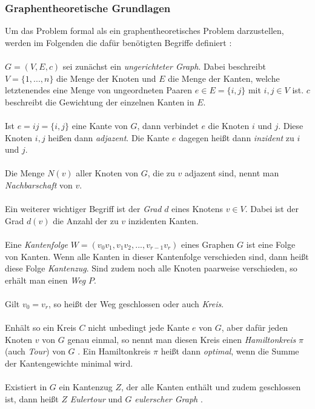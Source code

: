 \documentclass[doktyp=barbeit, sprache=german]{TUBAFarbeiten}
\begin{document}
\subsubsection{Graphentheoretische Grundlagen} \label{graphbasics}
Um das Problem formal als ein graphentheoretisches Problem darzustellen, werden im Folgenden die dafür benötigten Begriffe definiert \cite{graphKemnitz}:
\\\\$G = (V,E,c)$ sei zunächst ein \textit{ungerichteter Graph}. Dabei beschreibt $V = \{1,...,n\}$ die Menge der Knoten und $E$ die Menge der Kanten, welche letztenendes eine Menge von ungeordneten Paaren $e \in E = \{i,j\}$ mit $i,j \in V$ ist. $c$ beschreibt die Gewichtung der einzelnen Kanten in $E$.
\\\\Ist $e = ij = \{i,j\}$ eine Kante von $G$, dann verbindet $e$ die Knoten $i$ und $j$. Diese Knoten $i,j$ heißen dann \textit{adjazent}. Die Kante $e$ dagegen heißt dann \textit{inzident} zu $i$ und $j$. 
\\\\Die Menge $N(v)$ aller Knoten von $G$, die zu $v$ adjazent sind, nennt man \textit{Nachbarschaft} von $v$.
\\\\Ein weiterer wichtiger Begriff ist der \textit{Grad} $d$ eines Knotens $v \in V$. Dabei ist der Grad $d(v)$ die Anzahl der zu $v$ inzidenten Kanten.
\\\\Eine \textit{Kantenfolge} $W = (v_0v_1,v_1v_2,...,v_{r-1}v_r)$ eines Graphen $G$ ist eine Folge von Kanten. Wenn alle Kanten in dieser Kantenfolge verschieden sind, dann heißt diese Folge \textit{Kantenzug}. Sind zudem noch alle Knoten paarweise verschieden, so erhält man einen \textit{Weg} $P$.
\\\\Gilt $v_0 = v_r$, so heißt der Weg geschlossen oder auch \textit{Kreis}.
\\\\Enhält so ein Kreis $C$ nicht unbedingt jede Kante $e$ von $G$, aber dafür jeden Knoten $v$ von $G$ genau einmal, so nennt man diesen Kreis einen \textit{Hamiltonkreis} $\pi$ (auch \textit{Tour}) von $G$ \cite{graphDiestel}. Ein Hamiltonkreis $\pi$ heißt dann \textit{optimal}, wenn die Summe der Kantengewichte minimal wird.
\\\\Existiert in $G$ ein Kantenzug $Z$, der alle Kanten enthält und zudem geschlossen ist, dann heißt $Z$ \textit{Eulertour} und $G$ \textit{eulerscher Graph} \cite{graphKemnitz}.
\end{document}
